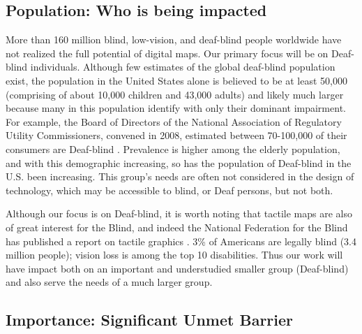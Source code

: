 \subsection{Population: Who is being impacted}
More than 160 million blind, low-vision, and deaf-blind people worldwide have not realized the full potential of digital maps. 
Our primary focus will be on Deaf-blind individuals. Although few estimates of the global deaf-blind population exist, the population in the United States alone is believed to be at least 50,000 
(comprising of about 10,000 children and 43,000 adults) \cite{NCDB} and likely much larger because many in this
population identify with only their dominant impairment. For example, the Board of Directors of the National Association of Regulatory Utility Commissioners, convened in 2008, estimated between 70-100,000 of their consumers are Deaf-blind \cite{NARUC}.
Prevalence is higher among the elderly population, and with this demographic increasing, so has the population of Deaf-blind in the U.S. been increasing. This group's needs are often not considered in the design of technology, which may be accessible to blind, or Deaf persons, but not both. 

Although our focus is on Deaf-blind, it is worth noting that tactile maps are also of great interest for the Blind, and indeed the National Federation for the Blind has published a report on tactile graphics \cite{lobben2015tactile}. 3\% of Americans are legally blind (3.4 million people); vision loss is among the top 10 disabilities.
Thus our work will have impact both on an important and understudied smaller group (Deaf-blind) and also serve the needs of a much larger group. 


\subsection{Importance: Significant Unmet Barrier}

